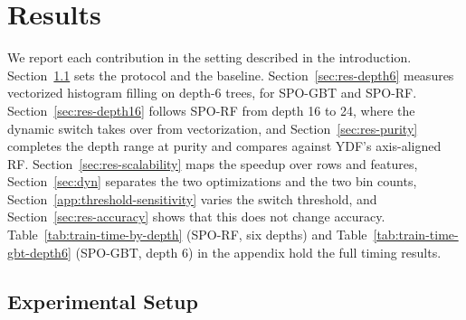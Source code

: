 \documentclass[sigconf]{acmart}%
\begin{document}




\section{Results}
\label{sec:results}


We report each contribution in the setting described in the introduction. Section~\ref{app:parameters} sets the protocol and the baseline. Section~\ref{sec:res-depth6} measures vectorized histogram filling on depth-6 trees, for SPO-GBT and SPO-RF. Section~\ref{sec:res-depth16} follows SPO-RF from depth 16 to 24, where the dynamic switch takes over from vectorization, and Section~\ref{sec:res-purity} completes the depth range at purity and compares against YDF's axis-aligned RF. Section~\ref{sec:res-scalability} maps the speedup over rows and features, Section~\ref{sec:dyn} separates the two optimizations and the two bin counts, Section~\ref{app:threshold-sensitivity} varies the switch threshold, and Section~\ref{sec:res-accuracy} shows that this does not change accuracy. Table~\ref{tab:train-time-by-depth} (SPO-RF, six depths) and Table~\ref{tab:train-time-gbt-depth6} (SPO-GBT, depth 6) in the appendix hold the full timing results.

\subsection{Experimental Setup}
\label{app:parameters}
\end{document}
